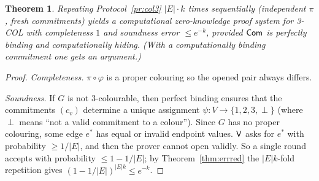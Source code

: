 \documentclass[11pt,a4paper]{report}
\theoremstyle{plain}
\newtheorem{theorem}{Theorem}[chapter]
\theoremstyle{definition}
\theoremstyle{remark}
\begin{document}
\begin{theorem}\label{thm:3col}
Repeating Protocol~\ref{pr:col3} $|E|\cdot k$ times sequentially (independent $\pi$, fresh commitments) yields a computational zero-knowledge proof system for 3-COL with completeness $1$ and soundness error $\le e^{-k}$, provided $\mathsf{Com}$ is perfectly binding and computationally hiding. (With a computationally binding commitment one gets an \emph{argument}.)
\end{theorem}
\begin{proof}
\emph{Completeness.} $\pi\circ\varphi$ is a proper colouring so the opened pair always differs.

\emph{Soundness.} If $G$ is not 3-colourable, then perfect binding ensures that the commitments $(c_v)$ determine a unique assignment $\psi:V\to\{1,2,3,\perp\}$ (where $\perp$ means ``not a valid commitment to a colour''). Since $G$ has no proper colouring, some edge $e^*$ has equal or invalid endpoint values. $\mathsf{V}$ asks for $e^*$ with probability $\ge1/|E|$, and then the prover cannot open validly. So a single round accepts with probability $\le1-1/|E|$; by Theorem~\ref{thm:errred} the $|E|k$-fold repetition gives $(1-1/|E|)^{|E|k}\le e^{-k}$.


\end{proof}
\end{document}
